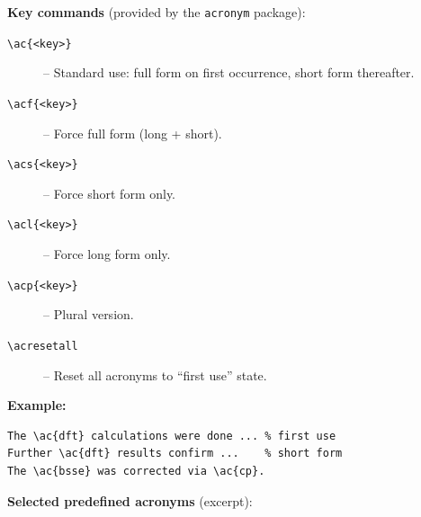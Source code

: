 \documentclass[a4paper,12pt]{article}
\begin{document}
\medskip
\noindent\textbf{Key commands} (provided by the \texttt{acronym} package):
\begin{description}
  \item[\texttt{\textbackslash ac\{<key>\}}]  – Standard use: full form on first occurrence, short form thereafter.
  \item[\texttt{\textbackslash acf\{<key>\}}] – Force full form (long + short).
  \item[\texttt{\textbackslash acs\{<key>\}}] – Force short form only.
  \item[\texttt{\textbackslash acl\{<key>\}}] – Force long form only.
  \item[\texttt{\textbackslash acp\{<key>\}}] – Plural version.
  \item[\texttt{\textbackslash acresetall}]   – Reset all acronyms to ``first use'' state.
\end{description}

\medskip
\noindent\textbf{Example:}
\begin{verbatim}
The \ac{dft} calculations were done ... % first use
Further \ac{dft} results confirm ...    % short form
The \ac{bsse} was corrected via \ac{cp}.
\end{verbatim}

\medskip
\noindent\textbf{Selected predefined acronyms} (excerpt):
\end{document}
